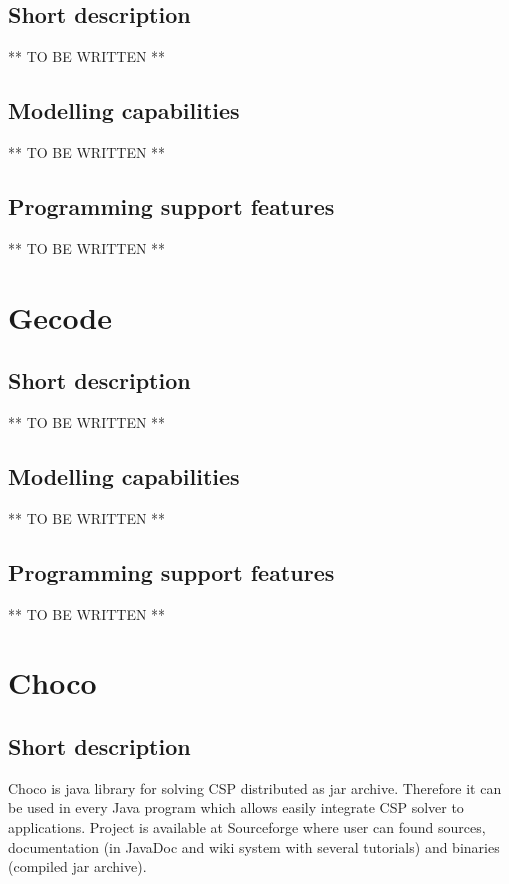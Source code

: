 \subsection{Short description}

** TO BE WRITTEN **

\subsection{Modelling capabilities}

** TO BE WRITTEN **

\subsection{Programming support features}

** TO BE WRITTEN **


\section{Gecode}

\subsection{Short description}

** TO BE WRITTEN **

\subsection{Modelling capabilities}

** TO BE WRITTEN **

\subsection{Programming support features}

** TO BE WRITTEN **


\section{Choco}

\subsection{Short description}

Choco is java library for solving CSP distributed as jar archive. Therefore it can
be used in every Java program which allows easily integrate CSP solver to applications.
Project is available at Sourceforge where user can found sources, documentation (in 
JavaDoc and wiki system with several tutorials) and binaries (compiled jar archive).

